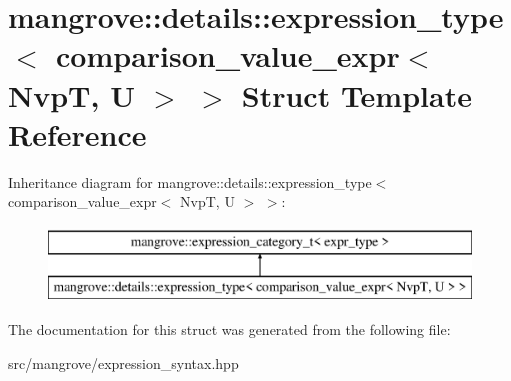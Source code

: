 \hypertarget{structmangrove_1_1details_1_1expression__type_3_01comparison__value__expr_3_01NvpT_00_01U_01_4_01_4}{}\section{mangrove\+:\+:details\+:\+:expression\+\_\+type$<$ comparison\+\_\+value\+\_\+expr$<$ NvpT, U $>$ $>$ Struct Template Reference}
\label{structmangrove_1_1details_1_1expression__type_3_01comparison__value__expr_3_01NvpT_00_01U_01_4_01_4}
Inheritance diagram for mangrove\+:\+:details\+:\+:expression\+\_\+type$<$ comparison\+\_\+value\+\_\+expr$<$ NvpT, U $>$ $>$\+:\begin{figure}[H]
\begin{center}
\leavevmode
\includegraphics[height=2.000000cm]{structmangrove_1_1details_1_1expression__type_3_01comparison__value__expr_3_01NvpT_00_01U_01_4_01_4}
\end{center}
\end{figure}


The documentation for this struct was generated from the following file\+:\begin{DoxyCompactItemize}
\item 
src/mangrove/expression\+\_\+syntax.\+hpp\end{DoxyCompactItemize}
